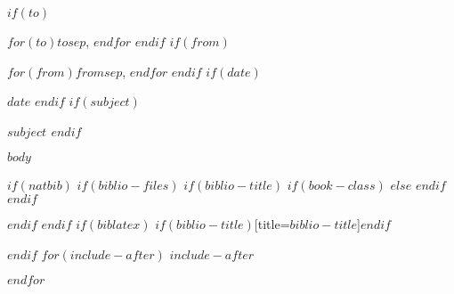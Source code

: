 \documentclass[$if(fontsize)$$fontsize$,$endif$$if(lang)$$lang$,$endif$$if(papersize)$$papersize$,$endif$$for(classoption)$$classoption$$sep$,$endfor$]{$documentclass$}
\begin{document}
\vspace{-40pt}
\vspace{-80pt}
\begin{description}[leftmargin=!,itemsep=3pt,labelwidth=\widthof{\textbf{Subject:}  }]
  $if(to)$
    \item[To:] $for(to)$$to$$sep$, $endfor$
  $endif$
  $if(from)$
    \item[From:] $for(from)$$from$$sep$, $endfor$
  $endif$
  $if(date)$
    \item[Date:] $date$
  $endif$
  $if(subject)$
    \item[Subject:] \bfseries{$subject$}
  $endif$
\end{description}
\vspace{-10pt}
\noindent\makebox[\linewidth]{\rule{\textwidth}{0.4pt}}
\vspace{-25pt}


$body$

%
%
% 

$if(natbib)$
$if(biblio-files)$
$if(biblio-title)$
$if(book-class)$
\renewcommand\bibname{$biblio-title$}
$else$
\renewcommand\refname{$biblio-title$}
$endif$
$endif$


$endif$
$endif$
$if(biblatex)$
\printbibliography$if(biblio-title)$[title=$biblio-title$]$endif$

$endif$
$for(include-after)$
$include-after$

$endfor$
\end{document}
